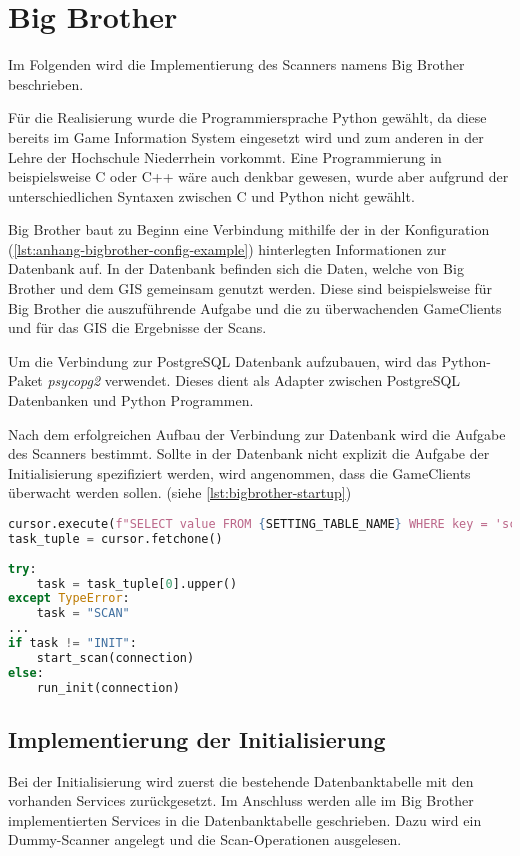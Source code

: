 \section{Big Brother}

Im Folgenden wird die Implementierung des Scanners namens Big Brother beschrieben.

Für die Realisierung wurde die Programmiersprache Python gewählt, da diese bereits im Game Information System eingesetzt wird und zum anderen in der Lehre der Hochschule Niederrhein vorkommt. Eine Programmierung in beispielsweise C oder C++ wäre auch denkbar gewesen, wurde aber aufgrund der unterschiedlichen Syntaxen zwischen C und Python nicht gewählt.

Big Brother baut zu Beginn eine Verbindung mithilfe der in der Konfiguration (\autoref{lst:anhang-bigbrother-config-example}) hinterlegten Informationen zur Datenbank auf. In der Datenbank befinden sich die Daten, welche von Big Brother und dem GIS gemeinsam genutzt werden. Diese sind beispielsweise für Big Brother die auszuführende Aufgabe und die zu überwachenden GameClients und für das GIS die Ergebnisse der Scans.

Um die Verbindung zur PostgreSQL Datenbank aufzubauen, wird das Python-Paket \textit{psycopg2} verwendet. Dieses dient als Adapter zwischen PostgreSQL Datenbanken und Python Programmen. 

Nach dem erfolgreichen Aufbau der Verbindung zur Datenbank wird die Aufgabe des Scanners bestimmt. Sollte in der Datenbank nicht explizit die Aufgabe der Initialisierung spezifiziert werden, wird angenommen, dass die GameClients überwacht werden sollen. (siehe \autoref{lst:bigbrother-startup})

\begin{lstlisting}[language=Python, frame=single, caption={Aufgabe des Scanners}, captionpos=b, label={lst:bigbrother-startup}]
cursor.execute(f"SELECT value FROM {SETTING_TABLE_NAME} WHERE key = 'scanner.task'")
task_tuple = cursor.fetchone()
	
try:
	task = task_tuple[0].upper()
except TypeError:
	task = "SCAN"
...
if task != "INIT":
	start_scan(connection)
else:
	run_init(connection)	
\end{lstlisting}


\subsection{Implementierung der Initialisierung}

Bei der Initialisierung wird zuerst die bestehende Datenbanktabelle mit den vorhanden Services zurückgesetzt.
Im Anschluss werden alle im Big Brother implementierten Services in die Datenbanktabelle geschrieben. Dazu wird ein Dummy-Scanner angelegt und die Scan-Operationen ausgelesen.


